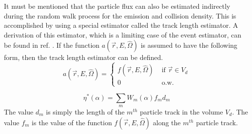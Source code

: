 It must be mentioned that the particle flux can also be estimated indirectly
during the random walk process for the emission and collision density. This
is accomplished by using a special estimator called the track length estimator.
A derivation of this estimator, which is a limiting case of the event 
estimator, can be found in ref. \citep{spanier_monte_1969}. If the function
$a(\vec{r},E,\hat{\Omega})$ is assumed to have the following form, then the 
track length estimator can be defined. 
\begin{equation}
  a(\vec{r},E,\hat{\Omega}) = 
  \begin{cases}
    f(\vec{r},E,\hat{\Omega}) & \text{ if } \vec{r} \in V_d \\
    0 & \text{ o.w.}
  \end{cases}
\end{equation}

\begin{equation}
  \eta^{*}(\alpha) = \sum_m W_m(\alpha)f_md_m
\end{equation}
The value $d_m$ is simply the length of the $m^{th}$ particle track in the 
volume $V_d$. The value $f_m$ is the value of the function 
$f(\vec{r},E,\hat{\Omega})$ along the $m^{th}$ particle track. 
